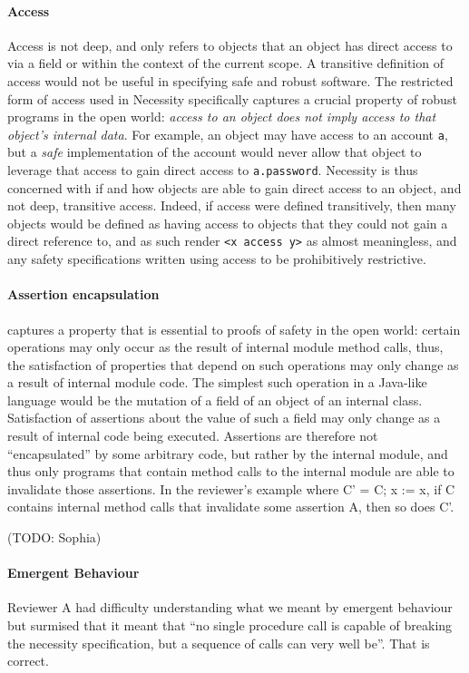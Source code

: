 \documentclass[11pt]{amsart}
\begin{document}
\paragraph{\textbf{Access}}  Access is not deep, and only refers to objects that an object has direct access to via a field or within the context of the current scope. 
A transitive definition of access would not be useful in specifying safe and robust software. The restricted form of access used in Necessity
specifically captures a crucial property of robust programs in the open world: \emph{access to an object does not imply access to that object's internal data}.
For example, an object may have access to an account \texttt{a}, but a \emph{safe} implementation of the account
would never allow that object to leverage that access to gain direct access to \texttt{a.password}.
Necessity is thus concerned with if and how objects are able to gain direct access to an object, and not deep, transitive access.
Indeed, if access were defined transitively, then many objects would be defined as having access to objects that they could not gain a direct reference to, 
and as such render \texttt{<x access y>} as almost meaningless, and any safety specifications written using access to be prohibitively restrictive.

\paragraph{\textbf{Assertion encapsulation}} captures a property that is essential to proofs of safety in the open world: certain operations may only occur as the result of internal module method calls, thus, the satisfaction of properties that depend on such operations may only change as a result of internal module code. The simplest such operation in a Java-like language would be the mutation of a field of an object of an internal class. Satisfaction of assertions about the value of such a field may only change as a result of internal code being executed. Assertions are therefore not ``encapsulated'' by some arbitrary code, but rather by the internal module, and thus only programs that contain method calls to the internal module are able to invalidate those assertions. In the reviewer's example where C' = C; x := x, if C contains internal method calls that invalidate some assertion A, then so does C'.

(TODO: Sophia)

\paragraph{\textbf{Emergent Behaviour}} 
Reviewer A had difficulty understanding what we meant by emergent behaviour but surmised that it meant that  ``no single procedure call is capable of breaking the necessity specification, but a sequence of calls can very well be''. That is correct.
\end{document}
